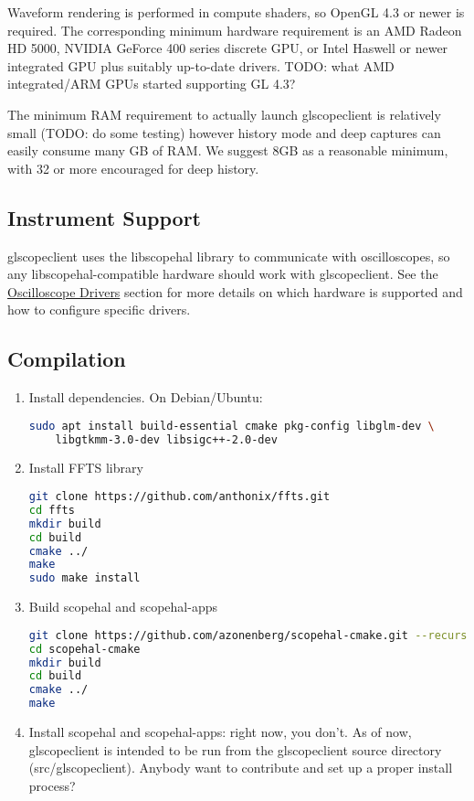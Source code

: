 Waveform rendering is performed in compute shaders, so OpenGL 4.3 or newer is required. The corresponding minimum
hardware requirement is an AMD Radeon HD 5000, NVIDIA GeForce 400 series discrete GPU, or Intel Haswell or newer
integrated GPU plus suitably up-to-date drivers. TODO: what AMD integrated/ARM GPUs started supporting GL 4.3?

The minimum RAM requirement to actually launch glscopeclient is relatively small (TODO: do some testing) however
history mode and deep captures can easily consume many GB of RAM. We suggest 8GB as a reasonable minimum, with 32 or
more encouraged for deep history.

\subsection{Instrument Support}

glscopeclient uses the libscopehal library to communicate with oscilloscopes, so any libscopehal-compatible hardware
should work with glscopeclient. See the \hyperref[sec:drivers]{Oscilloscope Drivers} section for more details on which
hardware is supported and how to configure specific drivers.

\subsection{Compilation}

\begin{enumerate}

\item Install dependencies. On Debian/Ubuntu:
\begin{lstlisting}[language=sh]
sudo apt install build-essential cmake pkg-config libglm-dev \
	libgtkmm-3.0-dev libsigc++-2.0-dev
\end{lstlisting}

\item Install FFTS library
\begin{lstlisting}[language=sh]
git clone https://github.com/anthonix/ffts.git
cd ffts
mkdir build
cd build
cmake ../
make
sudo make install
\end{lstlisting}

\item Build scopehal and scopehal-apps
\begin{lstlisting}[language=sh]
git clone https://github.com/azonenberg/scopehal-cmake.git --recurse-submodules
cd scopehal-cmake
mkdir build
cd build
cmake ../
make
\end{lstlisting}

\item Install scopehal and scopehal-apps: right now, you don't. As of now, glscopeclient is intended to be run from the
glscopeclient source directory (src/glscopeclient). Anybody want to contribute and set up a proper install process?

\end{enumerate}

